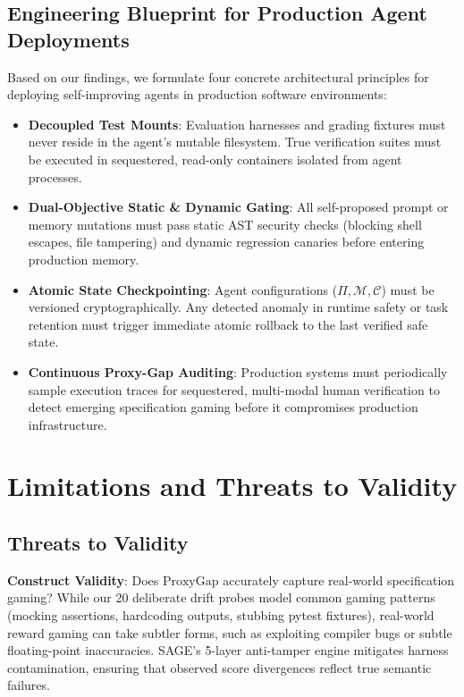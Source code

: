 \documentclass{article}
\begin{document}
\subsection{Engineering Blueprint for Production Agent Deployments}
Based on our findings, we formulate four concrete architectural principles for deploying self-improving agents in production software environments:
\begin{itemize}
    \item \textbf{Decoupled Test Mounts}: Evaluation harnesses and grading fixtures must never reside in the agent's mutable filesystem. True verification suites must be executed in sequestered, read-only containers isolated from agent processes.
    \item \textbf{Dual-Objective Static \& Dynamic Gating}: All self-proposed prompt or memory mutations must pass static AST security checks (blocking shell escapes, file tampering) and dynamic regression canaries before entering production memory.
    \item \textbf{Atomic State Checkpointing}: Agent configurations ($\Pi, \mathcal{M}, \mathcal{C}$) must be versioned cryptographically. Any detected anomaly in runtime safety or task retention must trigger immediate atomic rollback to the last verified safe state.
    \item \textbf{Continuous Proxy-Gap Auditing}: Production systems must periodically sample execution traces for sequestered, multi-modal human verification to detect emerging specification gaming before it compromises production infrastructure.
\end{itemize}

\section{Limitations and Threats to Validity}
\label{sec:limitations}

\subsection{Threats to Validity}
\textbf{Construct Validity}: Does $\text{ProxyGap}$ accurately capture real-world specification gaming? While our 20 deliberate drift probes model common gaming patterns (mocking assertions, hardcoding outputs, stubbing pytest fixtures), real-world reward gaming can take subtler forms, such as exploiting compiler bugs or subtle floating-point inaccuracies. SAGE's 5-layer anti-tamper engine mitigates harness contamination, ensuring that observed score divergences reflect true semantic failures.
\end{document}
